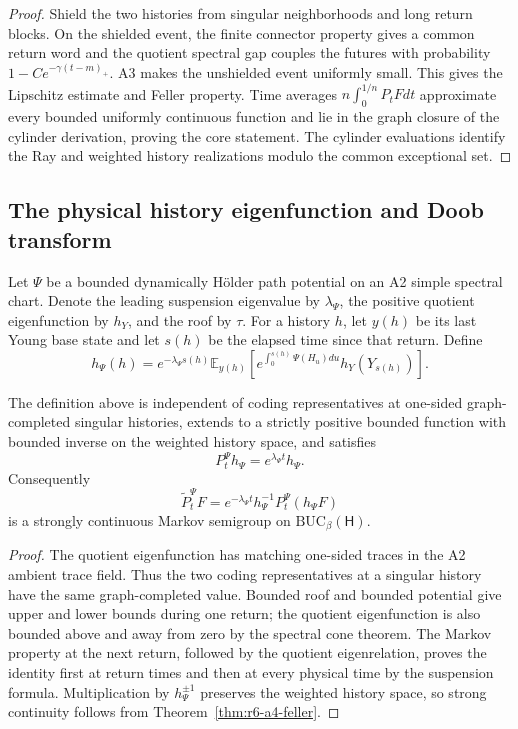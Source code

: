 \begin{proof}
Shield the two histories from singular neighborhoods and long return blocks.
On the shielded event, the finite connector property gives a common return
word and the quotient spectral gap couples the futures with probability
\(1-Ce^{-\gamma(t-m)_+}\).  A3 makes the unshielded event uniformly small.
This gives the Lipschitz estimate and Feller property.  Time averages
\(n\int_0^{1/n}P_tFdt\) approximate every bounded uniformly continuous
function and lie in the graph closure of the cylinder derivation, proving the
core statement.  The cylinder evaluations identify the Ray and weighted
history realizations modulo the common exceptional set.
\end{proof}

\subsection{The physical history eigenfunction and Doob transform}

Let \(\Psi\) be a bounded dynamically Hölder path potential on an A2 simple
spectral chart.  Denote the leading suspension eigenvalue by \(\lambda_\Psi\),
the positive quotient eigenfunction by \(h_Y\), and the roof by \(\tau\).
For a history \(h\), let \(y(h)\) be its last Young base state and let
\(s(h)\) be the elapsed time since that return.  Define
\[
h_\Psi(h)=
 e^{-\lambda_\Psi s(h)}
\mathbb E_{y(h)}\left[
 e^{\int_0^{s(h)}\Psi(H_u)du}
 h_Y(Y_{s(h)})
\right].
\]

\begin{theorem}
\label{thm:r6-a4-eigen}
The definition above is independent of coding representatives at
one-sided graph-completed singular histories, extends to a strictly positive
bounded function with bounded inverse on the weighted history space, and
satisfies
\[
P_t^\Psi h_\Psi=e^{\lambda_\Psi t}h_\Psi.
\]
Consequently
\[
\widetilde P_t^\Psi F
=e^{-\lambda_\Psi t}h_\Psi^{-1}P_t^\Psi(h_\Psi F)
\]
is a strongly continuous Markov semigroup on
\(\mathrm{BUC}_\beta(\mathsf H)\).
\end{theorem}

\begin{proof}
The quotient eigenfunction has matching one-sided traces in the A2 ambient
trace field.  Thus the two coding representatives at a singular history have
the same graph-completed value.  Bounded roof and bounded potential give
upper and lower bounds during one return; the quotient eigenfunction is also
bounded above and away from zero by the spectral cone theorem.  The Markov
property at the next return, followed by the quotient eigenrelation, proves
the identity first at return times and then at every physical time by the
suspension formula.  Multiplication by \(h_\Psi^{\pm1}\) preserves the
weighted history space, so strong continuity follows from
Theorem~\ref{thm:r6-a4-feller}.
\end{proof}

